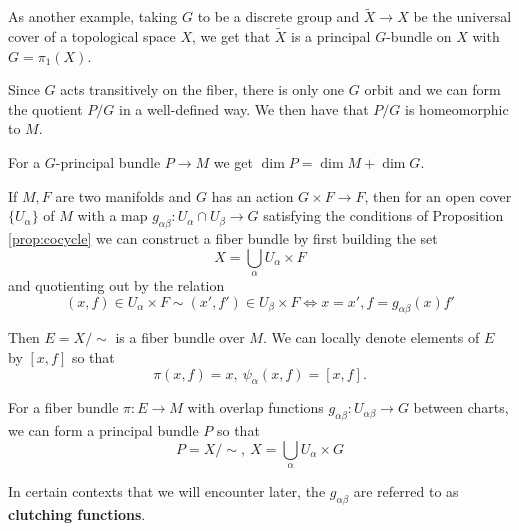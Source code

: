 		\begin{eg}
			As another example, taking $G$ to be a discrete group and $\tilde X \to X$ be the universal cover of a topological space $X$, we get that $\tilde X$ is a principal $G$-bundle on $X$ with $G=\pi_1(X)$.
		\end{eg}
		
		Since $G$ acts transitively on the fiber, there is only one $G$ orbit and we can form the quotient $P/G$ in a well-defined way. We then have that $P/G$ is homeomorphic to $M$.
		\begin{cor}
			For a $G$-principal bundle $P \to M$ we get $\dim P = \dim M + \dim G$.
		\end{cor}
		
		If $M,F$ are two manifolds and $G$ has an action $G \times F \rightarrow F$, then for an open cover $\{ U_\alpha \}$ of $M$ with a map $g_{\alpha \beta}: U_{\alpha}\cap U_{\beta} \to G$ satisfying the conditions of Proposition \ref{prop:cocycle} we can construct a fiber bundle by first building the set
		\[
			X = \bigcup_\alpha U_\alpha \times F
		\]
		and quotienting out by the relation
		\[
			(x, f) \in U_\alpha \times F \sim (x', f') \in U_\beta \times F \Longleftrightarrow x=x', f=g_{\alpha \beta}(x) f' 
		\]
		
		Then $E = X/\sim$ is a fiber bundle over $M$. We can locally denote elements of $E$ by $[x,f]$ so that
		\[
			\pi(x,f) = x, ~ \psi_\alpha(x,f) = [x,f].
		\]
		
		\begin{prop}
			For a fiber bundle $\pi: E \rightarrow M$ with overlap functions $g_{\alpha \beta}: U_{\alpha \beta} \rightarrow G$ between charts, we can form a principal bundle $P$ so that 
			\[
				P = X/\sim, ~ X = \bigcup_\alpha U_\alpha \times G
			\]
		\end{prop}
		In certain contexts that we will encounter later, the $g_{\alpha \beta}$ are referred to as \textbf{clutching functions}.		%
		
